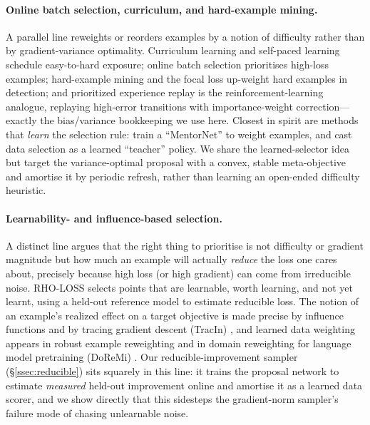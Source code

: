 \documentclass[11pt]{article}
\begin{document}
\paragraph{Online batch selection, curriculum, and hard-example mining.}
A parallel line reweights or reorders examples by a notion of difficulty rather
than by gradient-variance optimality. Curriculum learning \citep{bengio2009} and
self-paced learning \citep{kumar2010} schedule easy-to-hard exposure; online
batch selection \citep{loshchilov2015} prioritises high-loss examples; hard-example
mining \citep{shrivastava2016} and the focal loss \citep{lin2017} up-weight hard
examples in detection; and prioritized experience replay \citep{schaul2015} is the
reinforcement-learning analogue, replaying high-error transitions with
importance-weight correction---exactly the bias/variance bookkeeping we use here.
Closest in spirit are methods that \emph{learn} the selection rule:
\citet{jiang2018} train a ``MentorNet'' to weight examples, and \citet{fan2018}
cast data selection as a learned ``teacher'' policy. We share the learned-selector
idea but target the variance-optimal proposal with a convex, stable meta-objective
and amortise it by periodic refresh, rather than learning an open-ended difficulty
heuristic.

\paragraph{Learnability- and influence-based selection.}
A distinct line argues that the right thing to prioritise is not difficulty or
gradient magnitude but how much an example will actually \emph{reduce} the loss one
cares about, precisely because high loss (or high gradient) can come from
irreducible noise. RHO-LOSS \citep{mindermann2022} selects points that are
learnable, worth learning, and not yet learnt, using a held-out reference model to
estimate reducible loss. The notion of an example's realized effect on a target
objective is made precise by influence functions \citep{koh2017} and by tracing
gradient descent (TracIn) \citep{pruthi2020}, and learned data weighting appears in
robust example reweighting \citep{ren2018} and in domain reweighting for language
model pretraining (DoReMi) \citep{xie2023}. Our reducible-improvement sampler
(\S\ref{ssec:reducible}) sits squarely in this line: it trains the proposal network
to estimate \emph{measured} held-out improvement online and amortise it as a learned
data scorer, and we show directly that this sidesteps the gradient-norm sampler's
failure mode of chasing unlearnable noise.
\end{document}
